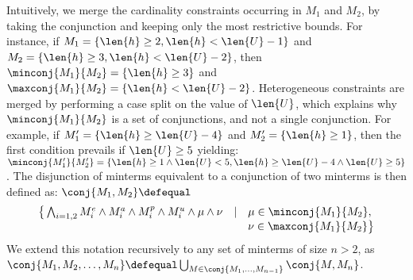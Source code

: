 Intuitively, we merge the cardinality constraints occurring in $M_1$
and $M_2$, by taking the conjunction and keeping only the most
restrictive bounds.  For instance, if $M_1 = \{ \len{h} \geq 2,
\len{h} < \len{U}-1 \}$ and $M_2 = \{ \len{h} \geq 3, \len{h} <
\len{U}-2 \}$, then $\minconj{M_1}{M_2} = \{ \len{h} \geq 3 \}$ and
$\maxconj{M_1}{M_2} = \{ \len{h} < \len{U}-2 \}$.  Heterogeneous
constraints are merged by performing a case split on the value of
$\len{U}$, which explains why $\minconj{M_1}{M_2}$ is a set of
conjunctions, and not a single conjunction.  For example, if $M_1' =
\{ \len{h} \geq \len{U}-4 \}$ and $M_2' = \{ \len{h} \geq 1 \}$, then
the first condition prevails if $\len{U} \geq 5$ yielding:
$\minconj{M_1'}{M_2'} = \{ \len{h} \geq 1 \wedge \len{U}<5, \len{h}
\geq \len{U}-4 \wedge \len{U}\geq 5\}$.  The disjunction of minterms
equivalent to a conjunction of two minterms is then defined as:
$\conj{M_1,M_2} \defequal$
\[\begin{array}{rcl}
\big\{\bigwedge_{i=1,2} M_i^e \wedge M_i^a \wedge M_i^p \wedge M_i^u \wedge \mu \wedge \nu 
& \mid & \mu \in \minconj{M_1}{M_2}, \\ 
&& \nu \in \maxconj{M_1}{M_2}\big\}
\end{array}\]
We extend this notation recursively to any set of minterms of size
$n>2$, as $\conj{M_1,M_2,\ldots,M_n} \defequal \bigcup_{M \in
  \conj{M_1, \ldots, M_{n-1}}} \conj{M, M_n}$.


